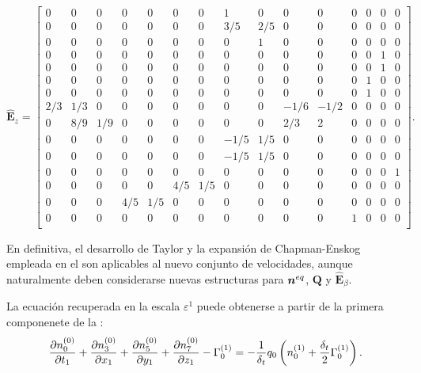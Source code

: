 \begin{equation}
	\hat{\bm{E}}_{z}=
	\begin{bmatrix}
	0 & 0 & 0 & 0 & 0 & 0 & 0 & 1 & 0 & 0 & 0 & 0 & 0 & 0 & 0 \\
	0 & 0 & 0 & 0 & 0 & 0 & 0 & 3/5 & 2/5 & 0 & 0 & 0 & 0 & 0 & 0 \\
	0 & 0 & 0 & 0 & 0 & 0 & 0 & 0 & 1 & 0 & 0 & 0 & 0 & 0 & 0 \\
	0 & 0 & 0 & 0 & 0 & 0 & 0 & 0 & 0 & 0 & 0 & 0 & 0 & 1 & 0 \\
	0 & 0 & 0 & 0 & 0 & 0 & 0 & 0 & 0 & 0 & 0 & 0 & 0 & 1 & 0 \\
	0 & 0 & 0 & 0 & 0 & 0 & 0 & 0 & 0 & 0 & 0 & 0 & 1 & 0 & 0 \\
	0 & 0 & 0 & 0 & 0 & 0 & 0 & 0 & 0 & 0 & 0 & 0 & 1 & 0 & 0 \\
	2/3 & 1/3 & 0 & 0 & 0 & 0 & 0 & 0 & 0 & -1/6 & -1/2 & 0 & 0 & 0 & 0 \\
	0 & 8/9 & 1/9 & 0 & 0 & 0 & 0 & 0 & 0 & 2/3 & 2 & 0 & 0 & 0 & 0 \\
	0 & 0 & 0 & 0 & 0 & 0 & 0 & -1/5 & 1/5 & 0 & 0 & 0 & 0 & 0 & 0 \\
	0 & 0 & 0 & 0 & 0 & 0 & 0 & -1/5 & 1/5 & 0 & 0 & 0 & 0 & 0 & 0 \\
	0 & 0 & 0 & 0 & 0 & 0 & 0 & 0 & 0 & 0 & 0 & 0 & 0 & 0 & 1 \\
	0 & 0 & 0 & 0 & 0 & 4/5 & 1/5 & 0 & 0 & 0 & 0 & 0 & 0 & 0 & 0 \\
	0 & 0 & 0 & 4/5 & 1/5 & 0 & 0 & 0 & 0 & 0 & 0 & 0 & 0 & 0 & 0 \\
	0 & 0 & 0 & 0 & 0 & 0 & 0 & 0 & 0 & 0 & 0 & 1 & 0 & 0 & 0 \\
	\end{bmatrix}.
\end{equation} 

En definitiva, el desarrollo de Taylor y la expansi\'on de Chapman-Enskog empleada en el  son aplicables al nuevo conjunto de velocidades, aunque naturalmente deben considerarse nuevas estructuras para $\bm{n}^{eq}$, $\bm{Q}$ y $\hat{\bm{E}}_{\beta}$. 

La ecuaci\'on recuperada en la escala $\varepsilon^1$ puede obtenerse a partir de la primera componenete de la :
\begin{equation}
	\dfrac{\partial n_{0}^{(0)}}{\partial t_1} 
	+ \dfrac{\partial n_{3}^{(0)}}{\partial x_1}
	+ \dfrac{\partial n_{5}^{(0)}}{\partial y_1}
	+ \dfrac{\partial n_{7}^{(0)}}{\partial z_1}		
	- \Gamma_0^{(1)}
	= - \dfrac{1}{\delta_t} q_0 \left( n_{0}^{(1)} + \dfrac{\delta_t}{2} \Gamma_0^{(1)} \right).
	\label{eq:eps1_comp_3d}
\end{equation}

